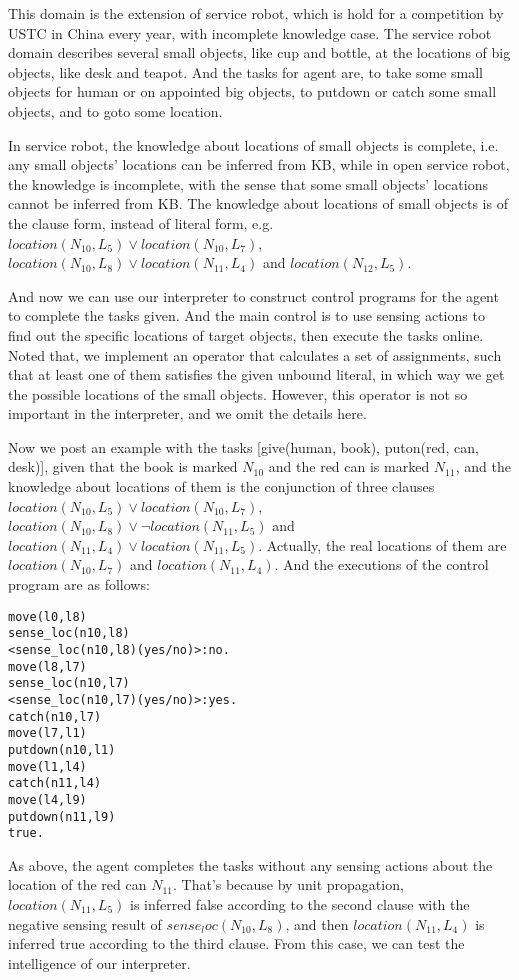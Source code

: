 \documentclass[letterpaper]{article}
\begin{document}
This domain is the extension of service robot, which is hold for a competition by USTC in China every year, with incomplete knowledge case. The service robot domain describes several small objects, like cup and bottle, at the locations of big objects, like desk and teapot. And the tasks for agent are, to take some small objects for human or on appointed big objects, to putdown or catch some small objects, and to goto some location.

In service robot, the knowledge about locations of small objects is complete, i.e. any small objects' locations can be inferred from KB, while in open service robot, the knowledge is incomplete, with the sense that some small objects' locations cannot be inferred from KB. The knowledge about locations of small objects is of the clause form, instead of literal form, e.g. $location(N_{10}, L_{5}) \vee location(N_{10}, L_{7})$, $location(N_{10}, L_{8}) \vee location(N_{11}, L_{4})$ and $location(N_{12}, L_{5})$.

And now we can use our interpreter to construct control programs for the agent to complete the tasks given. And the main control is to use sensing actions to find out the specific locations of target objects, then execute the tasks online. Noted that, we implement an operator that calculates a set of assignments, such that at least one of them satisfies the given unbound literal, in which way we get the possible locations of the small objects. However, this operator is not so important in the interpreter, and we omit the details here.

Now we post an example with the tasks [give(human, book), puton(red, can, desk)], given that the book is marked $N_{10}$ and the red can is marked $N_{11}$, and the knowledge about locations of them is the conjunction of three clauses $location(N_{10}, L_{5}) \vee location(N_{10}, L_{7})$, $location(N_{10}, L_{8}) \vee \neg location(N_{11}, L_{5})$ and $location(N_{11}, L_{4}) \vee location(N_{11}, L_{5})$. Actually, the real locations of them are $location(N_{10}, L_{7})$ and $location(N_{11}, L_{4})$. And the executions of the control program are as follows:
\begin{verbatim}
move(l0,l8)
sense_loc(n10,l8)
<sense_loc(n10,l8)(yes/no)>:no.
move(l8,l7)
sense_loc(n10,l7)
<sense_loc(n10,l7)(yes/no)>:yes.
catch(n10,l7)
move(l7,l1)
putdown(n10,l1)
move(l1,l4)
catch(n11,l4)
move(l4,l9)
putdown(n11,l9)
true.
\end{verbatim}

As above, the agent completes the tasks without any sensing actions about the location of the red can $N_{11}$. That's because by unit propagation, $location(N_{11}, L_{5})$ is inferred false according to the second clause with the negative sensing result of $sense_loc(N_{10}, L_{8})$, and then $location(N_{11}, L_{4})$ is inferred true according to the third clause. From this case, we can test the intelligence of our interpreter.
\end{document}
